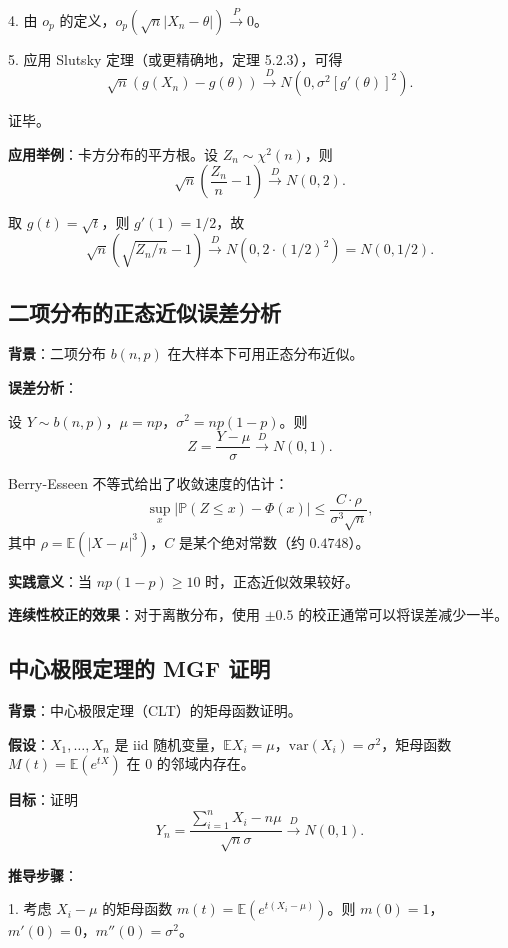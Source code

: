 4. 由 $o_p$ 的定义，$o_p(\sqrt{n}|X_n - \theta|) \xrightarrow{P} 0$。

5. 应用 Slutsky 定理（或更精确地，定理 5.2.3），可得
\[
\sqrt{n}(g(X_n) - g(\theta)) \xrightarrow{D} N(0, \sigma^2 [g'(\theta)]^2).
\]

证毕。

\textbf{应用举例}：卡方分布的平方根。设 $Z_n \sim \chi^2(n)$，则
\[
\sqrt{n}\left(\frac{Z_n}{n} - 1\right) \xrightarrow{D} N(0, 2).
\]

取 $g(t) = \sqrt{t}$，则 $g'(1) = 1/2$，故
\[
\sqrt{n}(\sqrt{Z_n/n} - 1) \xrightarrow{D} N(0, 2 \cdot (1/2)^2) = N(0, 1/2).
\]

\subsection{二项分布的正态近似误差分析}\label{sec:binomial-poisson-approximation}

\textbf{背景}：二项分布 $b(n,p)$ 在大样本下可用正态分布近似。

\textbf{误差分析}：

设 $Y \sim b(n,p)$，$\mu = np$，$\sigma^2 = np(1-p)$。则
\[
Z = \frac{Y - \mu}{\sigma} \xrightarrow{D} N(0,1).
\]

Berry-Esseen 不等式给出了收敛速度的估计：
\[
\sup_x |\mathbb{P}(Z \leq x) - \Phi(x)| \leq \frac{C \cdot \rho}{\sigma^3\sqrt{n}},
\]
其中 $\rho = \mathbb{E}(|X - \mu|^3)$，$C$ 是某个绝对常数（约 $0.4748$）。

\textbf{实践意义}：当 $np(1-p) \geq 10$ 时，正态近似效果较好。

\textbf{连续性校正的效果}：对于离散分布，使用 $\pm 0.5$ 的校正通常可以将误差减少一半。

\subsection{中心极限定理的 MGF 证明}\label{sec:clt-proof}

\textbf{背景}：中心极限定理（CLT）的矩母函数证明。

\textbf{假设}：$X_1, \ldots, X_n$ 是 iid 随机变量，$\mathbb{E}X_i = \mu$，$\text{var}(X_i) = \sigma^2$，矩母函数 $M(t) = \mathbb{E}(e^{tX})$ 在 $0$ 的邻域内存在。

\textbf{目标}：证明
\[
Y_n = \frac{\sum_{i=1}^n X_i - n\mu}{\sqrt{n}\sigma} \xrightarrow{D} N(0,1).
\]

\textbf{推导步骤}：

1. 考虑 $X_i - \mu$ 的矩母函数 $m(t) = \mathbb{E}(e^{t(X_i - \mu)})$。则 $m(0) = 1$，$m'(0) = 0$，$m''(0) = \sigma^2$。

